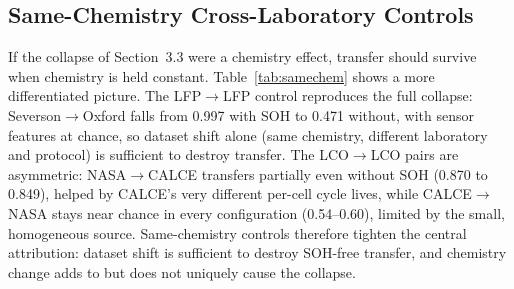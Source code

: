\documentclass[IJPHM, 2014, 00]{PHMSociety}
\begin{document}
\subsection{Same-Chemistry Cross-Laboratory Controls}
If the collapse of Section~3.3 were a chemistry effect, transfer should survive when chemistry is held constant. Table~\ref{tab:samechem} shows a more differentiated picture. The LFP$\to$LFP control reproduces the full collapse: Severson$\to$Oxford falls from 0.997 with SOH to 0.471 without, with sensor features at chance, so dataset shift alone (same chemistry, different laboratory and protocol) is sufficient to destroy transfer. The LCO$\to$LCO pairs are asymmetric: NASA$\to$CALCE transfers partially even without SOH (0.870 to 0.849), helped by CALCE's very different per-cell cycle lives, while CALCE$\to$NASA stays near chance in every configuration (0.54--0.60), limited by the small, homogeneous source. Same-chemistry controls therefore tighten the central attribution: dataset shift is sufficient to destroy SOH-free transfer, and chemistry change adds to but does not uniquely cause the collapse.

\begin{table}[!t]
\caption{Same-Chemistry Cross-Laboratory Controls at H=20 (XGBoost, Pooled AUC [CI]). Full Feature Sets Exercise the Zero-Imputation Confound; Common Sets Restrict Both Datasets to the Shared Four-Feature Subset.}
\label{tab:samechem}
\centering
{}
\end{table}
\end{document}
